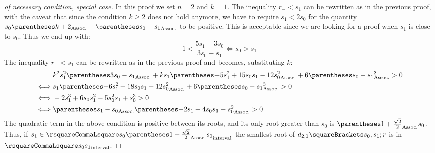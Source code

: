 \documentclass[10pt, a4paper, twoside]{basestyle}
\begin{document}
\begin{proof}[of necessary condition, special case]
In this proof we set $n=2$ and $k=1$.  The inequality $r_-<s_1$ can be rewritten as in the previous proof, with the caveat that since the condition $k≥2$ does not hold anymore, we have to require $s_1<2s_0$ for the quantity $s_0\pa{k+2}-\pa{s_0+s_1}$ to be positive.  This is acceptable since we are looking for a proof when $s_1$ is close to $s_0$.  Thus we end up with:
\[
1 < \frac{5s_1-3s_0}{3s_0-s_1} \iff s_0 > s_1
\]
The inequality $r_-<s_1$ can be rewritten as in the previous proof and becomes, substituting $k$:
\begin{align*}
&k^2 s_1^2\pa{3s_0-s_1} + k s_1\pa{-5s_1^2 + 15 s_0 s_1 - 12s_0^2} + 6\pa{s_0-s_1}^3 > 0 \\
\iff &s_1\pa{-6s_1^2 + 18 s_0 s_1 - 12 s_0^2} + 6\pa{s_0-s_1}^3 > 0 \\
\iff &-2s_1^3 + 6 s_0 s_1^2 - 5 s_0^2 s_1 + s_0^3 > 0 \\
\iff &\pa{s_1 - s_0}\pa{-2 s_1 + 4 s_0 s_1 - s_0^2} > 0
\end{align*}
The quadratic term in the above condition is positive between its roots, and its only root greater than $s_0$ is $\pa{1+\frac{\sqrt{2}}{2}}s_0$.  Thus, if $s_1 \in \intopen{s_0}{\pa{1+\frac{\sqrt{2}}{2}}s_0}$ the smallest root of $d_{2,1}\of{s_0, s_1; r}$ is in $\intopen{s_0} {s_1}$.

\end{proof}
\end{document}
